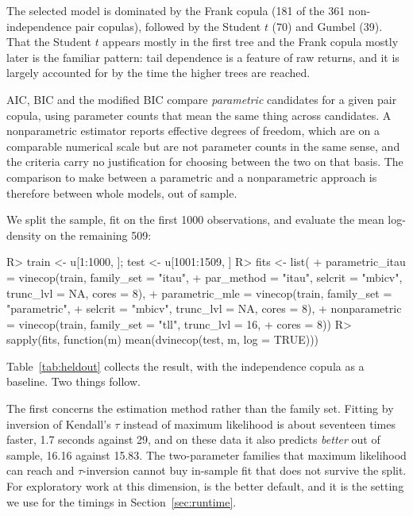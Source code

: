 \documentclass[article]{jss}
\begin{document}
The selected model is dominated by the Frank copula (181 of the 361
non-independence pair copulas), followed by the Student $t$ (70) and Gumbel
(39).  That the Student
$t$ appears mostly in the first tree and the Frank copula mostly later is the
familiar pattern: tail dependence is a feature of raw returns, and it is largely
accounted for by the time the higher trees are reached.

AIC, BIC and the modified BIC compare \emph{parametric} candidates for a
given pair copula, using parameter counts that mean the same thing across
candidates.  A nonparametric estimator reports effective degrees of
freedom, which are on a comparable numerical scale but are not parameter counts
in the same sense, and the criteria carry no justification for choosing between
the two on that basis.  The comparison to make between a parametric and a
nonparametric approach is therefore between whole models, out of sample.

We split the sample, fit on the first 1000 observations, and evaluate the mean
log-density on the remaining 509:

\begin{CodeChunk}
\begin{CodeInput}
R> train <- u[1:1000, ]; test <- u[1001:1509, ]
R> fits <- list(
+    parametric_itau = vinecop(train, family_set = "itau",
+      par_method = "itau", selcrit = "mbicv", trunc_lvl = NA, cores = 8),
+    parametric_mle = vinecop(train, family_set = "parametric",
+      selcrit = "mbicv", trunc_lvl = NA, cores = 8),
+    nonparametric = vinecop(train, family_set = "tll", trunc_lvl = 16,
+      cores = 8))
R> sapply(fits, function(m) mean(dvinecop(test, m, log = TRUE)))
\end{CodeInput}
\end{CodeChunk}

Table~\ref{tab:heldout} collects the result, with the independence copula as a
baseline.  Two things follow.

The first concerns the estimation method rather than the family set.  Fitting
by inversion of Kendall's $\tau$ instead of maximum likelihood is about
seventeen times faster, 1.7 seconds against 29, and on these data it also
predicts
\emph{better} out of sample, 16.16 against 15.83.  The two-parameter families
that maximum likelihood can reach and $\tau$-inversion cannot buy in-sample fit
that does not survive the split.  For exploratory work at this dimension,
 is the better default, and it is the setting we use
for the timings in Section~\ref{sec:runtime}.
\end{document}
